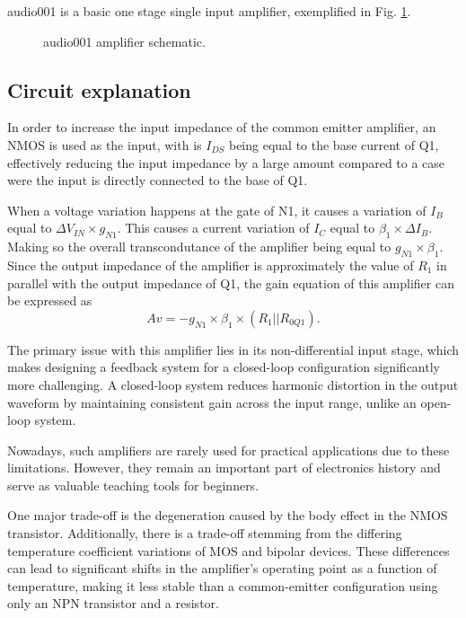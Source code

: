 \documentclass[12pt]{article}
\begin{document}
audio001 is a basic one stage single input amplifier, exemplified in Fig. \ref{audio001}.


\begin{figure}[H]
        \centering
        
        \caption{audio001 amplifier schematic.}
        \label{audio001}
\end{figure}


\subsection{Circuit explanation}

In order to increase the input impedance of the common emitter amplifier, an NMOS is used as the input,  with is $I_{DS}$ being equal to the base current of Q1, effectively reducing the input impedance by a large amount compared to a case were the input is directly connected to the base of Q1.

When a voltage variation happens at the gate of N1, it causes a variation of $I_{B}$ equal to $\Delta V_{IN} \times g_{N1}$.
This causes a current variation of $I_{C}$ equal to $\beta_1 \times \Delta I_{B}$. Making so the overall transcondutance of the amplifier being equal to $g_{N1} \times \beta_1 $. 
Since the output impedance of the amplifier is approximately the value of $R_{1}$ in parallel with the output impedance of Q1, the gain equation of this amplifier can be expressed as
\begin{equation}
    Av = - g_{N1} \times \beta_1 \times (R_1||R_{0Q1}).
\end{equation}

The primary issue with this amplifier lies in its non-differential input stage, which makes designing a feedback system for a closed-loop configuration significantly more challenging. A closed-loop system reduces harmonic distortion in the output waveform by maintaining consistent gain across the input range, unlike an open-loop system.

Nowadays, such amplifiers are rarely used for practical applications due to these limitations. However, they remain an important part of electronics history and serve as valuable teaching tools for beginners.

One major trade-off is the degeneration caused by the body effect in the NMOS transistor. Additionally, there is a trade-off stemming from the differing temperature coefficient variations of MOS and bipolar devices. These differences can lead to significant shifts in the amplifier's operating point as a function of temperature, making it less stable than a common-emitter configuration using only an NPN transistor and a resistor.
\end{document}
